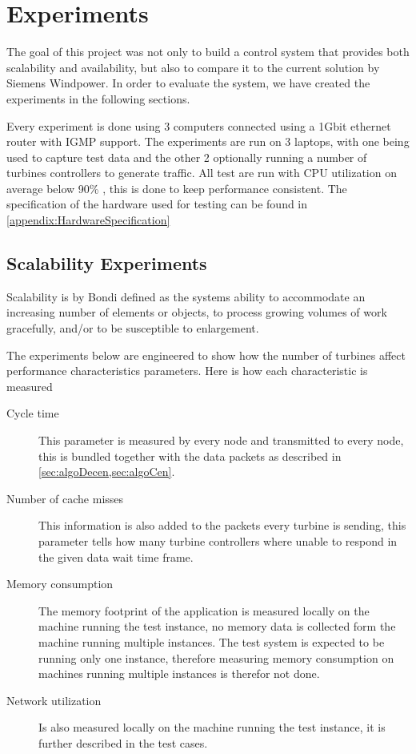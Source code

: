
\chapter{Experiments}
The goal of this project was not only to build a control system that provides both scalability and availability, but also to compare it to the current solution by Siemens Windpower. 
In order to evaluate the system, we have created the experiments in the following sections.

Every experiment is done using 3 computers connected using a 1Gbit ethernet router with IGMP support.
The experiments are run on 3 laptops, with one being used to capture test data and the other 2 optionally running a number of turbines controllers to generate traffic.
All test are run with CPU utilization on average below 90\% , this is done to keep performance consistent.
The specification of the hardware used for testing can be found in \cref{appendix:HardwareSpecification}

\section{Scalability Experiments}
Scalability is by Bondi\cite{Bondi:2000:CSI:350391.350432} defined as the systems ability to accommodate an increasing number of elements or objects, to process growing volumes of work gracefully, and/or to be susceptible to enlargement. 

The experiments below are engineered to show how the number of turbines affect performance characteristics parameters. Here is how each characteristic is measured

\begin{description}
	\item [Cycle time] This parameter is measured by every node and transmitted to every node, this is bundled together with the data packets as described in \cref{sec:algoDecen,sec:algoCen}.
	\item [Number of cache misses] This information is also added to the packets every turbine is sending, this parameter tells how many turbine controllers where unable to respond in the given data wait time frame. 
	\item [Memory consumption] The memory footprint of the application is measured locally on the machine running the test instance, no memory data is collected form the machine running multiple instances. The test system is expected to be running only one instance, therefore measuring memory consumption on machines running multiple instances is therefor not done.
	\item [Network utilization] Is also measured locally on the machine running the test instance, it is further described in the test cases.
\end{description}

